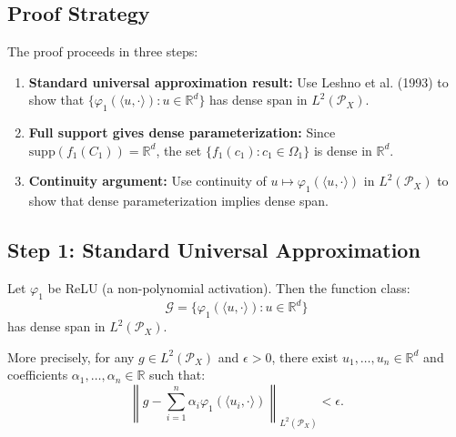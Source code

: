 \subsection{Proof Strategy}

The proof proceeds in three steps:

\begin{enumerate}
\item \textbf{Standard universal approximation result:} Use Leshno et al. (1993) to show that $\{\varphi_1(\langle u, \cdot\rangle) : u \in \mathbb{R}^d\}$ has dense span in $L^2(\mathcal{P}_X)$.

\item \textbf{Full support gives dense parameterization:} Since $\text{supp}(f_1(C_1)) = \mathbb{R}^d$, the set $\{f_1(c_1) : c_1 \in \Omega_1\}$ is dense in $\mathbb{R}^d$.

\item \textbf{Continuity argument:} Use continuity of $u \mapsto \varphi_1(\langle u, \cdot\rangle)$ in $L^2(\mathcal{P}_X)$ to show that dense parameterization implies dense span.
\end{enumerate}

\subsection{Step 1: Standard Universal Approximation}

\begin{lemma}
\label{lem:leshno-relu}
Let $\varphi_1$ be ReLU (a non-polynomial activation). Then the function class:
\[
\mathcal{G} = \{\varphi_1(\langle u, \cdot\rangle) : u \in \mathbb{R}^d\}
\]
has dense span in $L^2(\mathcal{P}_X)$.

More precisely, for any $g \in L^2(\mathcal{P}_X)$ and $\epsilon > 0$, there exist $u_1, \ldots, u_n \in \mathbb{R}^d$ and coefficients $\alpha_1, \ldots, \alpha_n \in \mathbb{R}$ such that:
\[
\left\|g - \sum_{i=1}^n \alpha_i \varphi_1(\langle u_i, \cdot\rangle)\right\|_{L^2(\mathcal{P}_X)} < \epsilon.
\]
\end{lemma}

